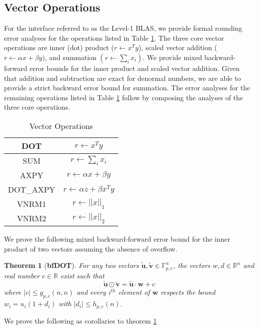 \documentclass[conference]{IEEEtran}
\newcommand{\vc}[1]{\textbf{#1}}
\newtheorem{theorem}{Theorem}[section]
\begin{document}
\subsection{Vector Operations}
For the interface referred to as the Level-1 BLAS, we provide formal rounding error analyses for the operations listed in Table \ref{tab:vec}. The three core vector operations are inner (dot) product ($r \leftarrow x^T y$), scaled vector addition ($r \leftarrow \alpha x + \beta y )$, and summation $(r \leftarrow \sum_{i} x_i)$. We provide mixed backward-forward error bounds for the inner product and scaled vector addition. Given that addition and subtraction are exact for denormal numbers, we are able to provide a strict backward error bound for summation. The error analyses for the remaining operations listed in Table \ref{tab:vec} follow by composing the analyses of the three core operations. 

\begin{table}[htbp]
\caption{Vector Operations}
\begin{center}
\setlength{\tabcolsep}{0.5em} %
{\renewcommand{\arraystretch}{1.4}%
\begin{tabular}{|c|c|}
\hline
     DOT & $r \leftarrow x^T y$   \\
          \hline
     SUM & $ r \leftarrow \sum_{i} x_i $   \\
     \hline
     AXPY & $r \leftarrow \alpha x + \beta y $   \\
\hline
    DOT\_AXPY & $r \leftarrow  \alpha z + \beta x^T y$   \\
\hline
     VNRM1 & $r \leftarrow ||x||_1$   \\ 
     VNRM2 &  $r \leftarrow ||x||_2 $   \\ 
     \hline
     \end{tabular} }
\label{tab:vec}
\end{center}
\end{table}

We prove the following mixed backward-forward error bound for the inner product of two vectors assuming the absence of overflow. 

\begin{theorem}[\textbf{bfDOT}] For any two vectors $\tilde{\textbf{u}}, \tilde{\textbf{v}} \in \mathbb{F}_{p,e}^n$, the vectors $w,d \in \mathbb{R}^n$ and real number $c \in \mathbb{R}$ exist such that  
\[ \tilde{\textbf{u}} \odot \tilde{\textbf{v}} = \tilde{\textbf{u}} \cdot \textbf{w}  + {{c}}\] where $|c| \le g_{p,e} (n,n)$ and every $i^{th}$ element of $\vc{w}$ respects the bound $ {w}_i = u_i (1 + d_i)$ with $|d_i| \le h_{p,e}(n)$. \label{thm:bfDOT}
\end{theorem}
We prove the following as corollaries to theorem \ref{thm:bfDOT}   
\end{document}
